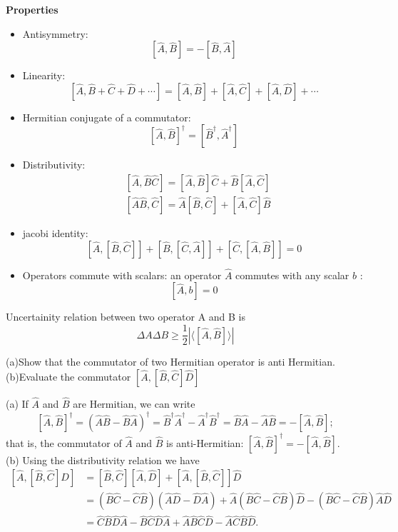 \textbf{Properties}\\
\begin{itemize}
	\item Antisymmetry:
	$$[\hat{A}, \hat{B}]=-[\hat{B}, \hat{A}]$$
	\item Linearity:
	 $$[\hat{A}, \hat{B}+\hat{C}+\hat{D}+\cdots]=[\hat{A}, \hat{B}]+[\hat{A}, \hat{C}]+[\hat{A}, \hat{D}]+\cdots$$
	 \item  Hermitian conjugate of a commutator: 
	 $$[\hat{A}, \hat{B}]^{\dagger}=\left[\hat{B}^{\dagger}, \hat{A}^{\dagger}\right]$$
	 \item  Distributivity: 
	 $$\begin{aligned}
	 	&{[\hat{A}, \hat{B} \hat{C}]=[\hat{A}, \hat{B}] \hat{C}+\hat{B}[\hat{A}, \hat{C}]} \\
	 	&{[\hat{A} \hat{B}, \hat{C}]=\hat{A}[\hat{B}, \hat{C}]+[\hat{A}, \hat{C}] \hat{B}}
	 \end{aligned}$$
	 \item jacobi identity:
	 $$[\hat{A},[\hat{B}, \hat{C}]]+[\hat{B},[\hat{C}, \hat{A}]]+[\hat{C},[\hat{A}, \hat{B}]]=0$$
	 \item Operators commute with scalars: an operator $\hat{A}$ commutes with any scalar $b$ :
	 $$
	 [\hat{A}, b]=0
	 $$
\end{itemize}
\begin{note}
	Uncertainity relation between two operator A  and B is \\
	$$\Delta A \Delta B \geq \frac{1}{2}\left| \langle \left[ \hat{A},\hat{B}\right] \rangle \right| $$
\end{note}
\begin{exercise}
	(a)Show that the commutator of two Hermitian operator is anti Hermitian.\\
	(b)Evaluate the commutator $\left[ \hat{A},\left[ \hat{B},\hat{C}\right] \hat{D}\right] $
\end{exercise}
\begin{answer}
	(a) If $\hat{A}$ and $\hat{B}$ are Hermitian, we can write
	$$
	[\hat{A}, \hat{B}]^{\dagger}=(\hat{A} \hat{B}-\hat{B} \hat{A})^{\dagger}=\hat{B}^{\dagger} \hat{A}^{\dagger}-\hat{A}^{\dagger} \hat{B}^{\dagger}=\hat{B} \hat{A}-\hat{A} \hat{B}=-[\hat{A}, \hat{B}] ;
	$$
	that is, the commutator of $\hat{A}$ and $\hat{B}$ is anti-Hermitian: $[\hat{A}, \hat{B}]^{\dagger}=-[\hat{A}, \hat{B}]$.\\
	(b) Using the distributivity relation we have
	$$
	\begin{aligned}
	[\hat{A},[\hat{B}, \hat{C}] \hat{D}] &=[\hat{B}, \hat{C}][\hat{A}, \hat{D}]+[\hat{A},[\hat{B}, \hat{C}]] \hat{D} \\
	&=(\hat{B} \hat{C}-\hat{C} \hat{B})(\hat{A} \hat{D}-\hat{D} \hat{A})+\hat{A}(\hat{B} \hat{C}-\hat{C} \hat{B}) \hat{D}-(\hat{B} \hat{C}-\hat{C} \hat{B}) \hat{A} \hat{D} \\
	&=\hat{C} \hat{B} \hat{D} \hat{A}-\hat{B} \hat{C} \hat{D} \hat{A}+\hat{A} \hat{B} \hat{C} \hat{D}-\hat{A} \hat{C} \hat{B} \hat{D} .
	\end{aligned}
	$$
\end{answer}
